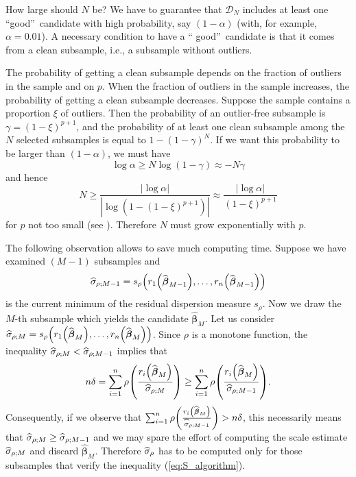 How large should $N$ be? We have to guarantee that $\mathcal{D}_{N}$ includes
at least one \textquotedblleft good\textquotedblright\ candidate with high
probability, say $\left(  1-\alpha\right)  $ (with, for example, $\alpha
=0.01$). A necessary condition to have a \textquotedblleft
good\textquotedblright\ candidate is that it comes from a clean subsample,
i.e., a subsample without outliers.

The probability of getting a clean subsample depends on the fraction of
outliers in the sample and on $p$. When the fraction of outliers in the sample
increases, the probability of getting a clean subsample decreases. Suppose the
sample contains a proportion $\xi$ of outliers. Then the probability of an
outlier-free subsample is $\gamma=(1-\xi)^{p+1}$, and the probability of at
least one clean subsample among the $N$ selected subsamples is equal to
$1-(1-\gamma)^{N}$. If we want this probability to be larger than $\left(
1-\alpha\right)  $, we must have
\[
\log\alpha\geq N\log(1-\gamma)\approx-N\gamma
\]
and hence
\begin{equation}
N\geq\frac{\left\vert \log\alpha\right\vert }{\left\vert \log\left(  1-\left(
1-\xi\right)  ^{p+1}\right)  \right\vert }\approx\frac{\left\vert \log
\alpha\right\vert }{\left(  1-\xi\right)  ^{p+1}} \label{eq:N}%
\end{equation}
for $p$ not too small (see \citealp{Salibian-Barrera:2004}). Therefore $N$
must grow exponentially with $p$.

The following observation allows to save much computing time. Suppose we have
examined $(M-1)$ subsamples and
\[
\sthat{\sigma}_{\rho;M-1}=s_{\rho}\left(  r_{1}\left(  \widehat
{\boldsymbol\beta}_{M-1}\right)  ,\ldots,r_{n}\left(  \widehat
{\boldsymbol\beta}_{M-1}\right)  \right)
\]
is the current minimum of the residual dispersion measure $s_{\rho}$. Now we
draw the $M$-th subsample which yields the candidate $\widehat
{\boldsymbol\beta}_{M}$. Let us consider $\sthat{\sigma}_{\rho;M}=s_{\rho
}\left(  r_{1}\left(  \sthat{\boldsymbol\beta}_{M}\right)  ,\ldots
,r_{n}\left(  \sthat{\boldsymbol\beta}_{M}\right)  \right)  $. Since
$\rho$ is a monotone function, the inequality $\widehat{\sigma}_{\rho
;M}<\widehat{\sigma}_{\rho;M-1}$ implies that
\begin{equation}
n\delta=\sum_{i=1}^{n}\rho\left(  \frac{r_{i}\left(  \widehat
{\boldsymbol\beta}_{M}\right)  }{\sthat{\sigma}_{\rho;M}}\right)  \geq
\sum_{i=1}^{n}\rho\left(  \frac{r_{i}\left(  \sthat{\boldsymbol\beta}%
_{M}\right)  }{\sthat{\sigma}_{\rho;M-1}}\right)  . \label{eq:S_algorithm}%
\end{equation}
Consequently, if we observe that $\sum_{i=1}^{n}\rho\left(  \frac{r_{i}\left(
\sthat{\boldsymbol\beta}_{M}\right)  }{\sthat{\sigma}_{\rho;M-1}%
}\right)  >n\delta$, this necessarily means that $\widehat{\sigma}_{\rho
;M}\geq\widehat{\sigma}_{\rho;M-1}$ and we may spare the effort of computing
the scale estimate $\widehat{\sigma}_{\rho;M}$ and discard $\widehat
{\boldsymbol\beta}_{M}$. Therefore $\widehat{\sigma}_{\rho}$ has to be
computed only for those subsamples that verify the inequality
(\ref{eq:S_algorithm}).

